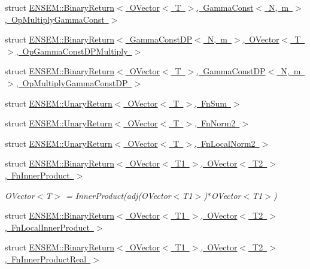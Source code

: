 \begin{DoxyCompactItemize}
struct \mbox{\hyperlink{structENSEM_1_1BinaryReturn_3_01OVector_3_01T_01_4_00_01GammaConst_3_01N_00_01m_01_4_00_01OpMultiplyGammaConst_01_4}{E\+N\+S\+E\+M\+::\+Binary\+Return$<$ O\+Vector$<$ T $>$, Gamma\+Const$<$ N, m $>$, Op\+Multiply\+Gamma\+Const $>$}}
\item 
struct \mbox{\hyperlink{structENSEM_1_1BinaryReturn_3_01GammaConstDP_3_01N_00_01m_01_4_00_01OVector_3_01T_01_4_00_01OpGammaConstDPMultiply_01_4}{E\+N\+S\+E\+M\+::\+Binary\+Return$<$ Gamma\+Const\+D\+P$<$ N, m $>$, O\+Vector$<$ T $>$, Op\+Gamma\+Const\+D\+P\+Multiply $>$}}
\item 
struct \mbox{\hyperlink{structENSEM_1_1BinaryReturn_3_01OVector_3_01T_01_4_00_01GammaConstDP_3_01N_00_01m_01_4_00_01OpMultiplyGammaConstDP_01_4}{E\+N\+S\+E\+M\+::\+Binary\+Return$<$ O\+Vector$<$ T $>$, Gamma\+Const\+D\+P$<$ N, m $>$, Op\+Multiply\+Gamma\+Const\+D\+P $>$}}
\item 
struct \mbox{\hyperlink{structENSEM_1_1UnaryReturn_3_01OVector_3_01T_01_4_00_01FnSum_01_4}{E\+N\+S\+E\+M\+::\+Unary\+Return$<$ O\+Vector$<$ T $>$, Fn\+Sum $>$}}
\item 
struct \mbox{\hyperlink{structENSEM_1_1UnaryReturn_3_01OVector_3_01T_01_4_00_01FnNorm2_01_4}{E\+N\+S\+E\+M\+::\+Unary\+Return$<$ O\+Vector$<$ T $>$, Fn\+Norm2 $>$}}
\item 
struct \mbox{\hyperlink{structENSEM_1_1UnaryReturn_3_01OVector_3_01T_01_4_00_01FnLocalNorm2_01_4}{E\+N\+S\+E\+M\+::\+Unary\+Return$<$ O\+Vector$<$ T $>$, Fn\+Local\+Norm2 $>$}}
\item 
struct \mbox{\hyperlink{structENSEM_1_1BinaryReturn_3_01OVector_3_01T1_01_4_00_01OVector_3_01T2_01_4_00_01FnInnerProduct_01_4}{E\+N\+S\+E\+M\+::\+Binary\+Return$<$ O\+Vector$<$ T1 $>$, O\+Vector$<$ T2 $>$, Fn\+Inner\+Product $>$}}
\begin{DoxyCompactList}\small\item\em O\+Vector$<$\+T$>$ = Inner\+Product(adj(\+O\+Vector$<$\+T1$>$)$\ast$\+O\+Vector$<$\+T1$>$) \end{DoxyCompactList}\item 
struct \mbox{\hyperlink{structENSEM_1_1BinaryReturn_3_01OVector_3_01T1_01_4_00_01OVector_3_01T2_01_4_00_01FnLocalInnerProduct_01_4}{E\+N\+S\+E\+M\+::\+Binary\+Return$<$ O\+Vector$<$ T1 $>$, O\+Vector$<$ T2 $>$, Fn\+Local\+Inner\+Product $>$}}
\item 
struct \mbox{\hyperlink{structENSEM_1_1BinaryReturn_3_01OVector_3_01T1_01_4_00_01OVector_3_01T2_01_4_00_01FnInnerProductReal_01_4}{E\+N\+S\+E\+M\+::\+Binary\+Return$<$ O\+Vector$<$ T1 $>$, O\+Vector$<$ T2 $>$, Fn\+Inner\+Product\+Real $>$}}

\end{DoxyCompactItemize}
